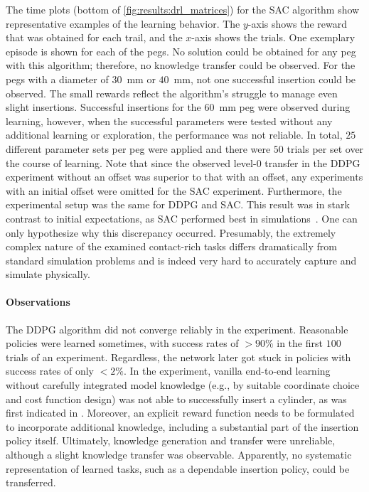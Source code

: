 The time plots (bottom of \ref{fig:results:drl_matrices}) for the SAC algorithm show representative examples of the learning behavior.
The $y$-axis shows the reward that was obtained for each trail, and the $x$-axis shows the trials.
One exemplary episode is shown for each of the pegs.
No solution could be obtained for any peg with this algorithm; therefore, no knowledge transfer could be observed.
For the pegs with a diameter of $30$~mm or $40$~mm, not one successful insertion could be observed.
The small rewards reflect the algorithm's struggle to manage even slight insertions.
Successful insertions for the $60$~mm peg were observed during learning, however, when the successful parameters were tested without any additional learning or exploration, the performance was not reliable.
In total, $25$ different parameter sets per peg were applied and there were $50$ trials per set over the course of learning.
Note that since the observed level-0 transfer in the DDPG experiment without an offset was superior to that with an offset, any experiments with an initial offset were omitted for the SAC experiment.
Furthermore, the experimental setup was the same for DDPG and SAC.
This result was in stark contrast to initial expectations, as SAC performed best in simulations~\cite{haarnoja2018soft2}.
One can only hypothesize why this discrepancy occurred.
Presumably, the extremely complex nature of the examined contact-rich tasks differs dramatically from standard simulation problems and is indeed very hard to accurately capture and simulate physically.

\paragraph{Observations}

The DDPG algorithm did not converge reliably in the experiment.
Reasonable policies were learned sometimes, with success rates of $ > 90\% $ in the first $100$ trials of an experiment.
Regardless, the network later got stuck in policies with success rates of only $< 2\%$.
In the experiment, vanilla end-to-end learning without carefully integrated model knowledge (e.g., by suitable coordinate choice and cost function design) was not able to successfully insert a cylinder, as was first indicated in \cite{Voigt.2021}.
Moreover, an explicit reward function needs to be formulated to incorporate additional knowledge, including a substantial part of the insertion policy itself.
Ultimately, knowledge generation and transfer were unreliable, although a slight knowledge transfer was observable.
Apparently, no systematic representation of learned tasks, such as a dependable insertion policy, could be transferred.


